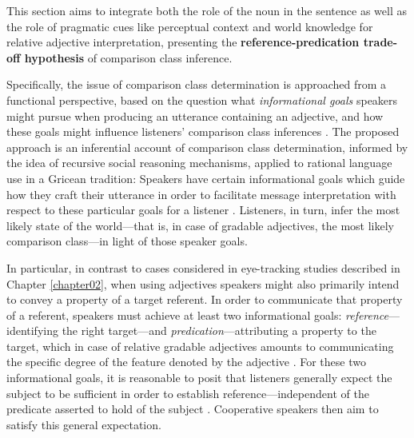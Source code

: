 This section aims to integrate both the role of the noun in the sentence as well as the role of pragmatic cues like perceptual context and world knowledge for relative adjective interpretation, presenting the \textbf{reference-predication trade-off hypothesis} of comparison class inference. 

Specifically, the issue of comparison class determination is approached from a functional perspective, based on the question what \emph{informational goals} speakers might pursue when producing an utterance containing an adjective, and how these goals might influence listeners’ comparison class inferences \parencite{tessler2020}.
The proposed approach is an inferential account of comparison class determination, informed by the idea of recursive social reasoning mechanisms, applied to rational language use in a Gricean tradition: Speakers have certain informational goals which guide how they craft their utterance in order to facilitate message interpretation with respect to these particular goals for a listener \parencite{goodman2016}. Listeners, in turn, infer the most likely state of the world---that is, in case of gradable adjectives, the most likely comparison class---in light of those speaker goals. 

In particular, in contrast to cases considered in eye-tracking studies described in Chapter \ref{chapter02},  when using adjectives speakers might also primarily intend to convey a property of a target referent. In order to communicate that property of a referent, speakers must achieve at least two informational goals: \textit{reference}---identifying the right target---and \textit{predication}---attributing a property to the target, which in case of relative gradable adjectives amounts to communicating the specific degree of the feature denoted by the adjective \parencite{Reboul2001, Kennedy2007}.  
For these two informational goals, it is reasonable to posit that listeners generally expect the subject to be sufficient in order to establish reference---independent of the predicate asserted to hold of the subject \parencite{Reboul2001, syrett2010meaning, searle1969speech}. Cooperative speakers then aim to satisfy this general expectation.

